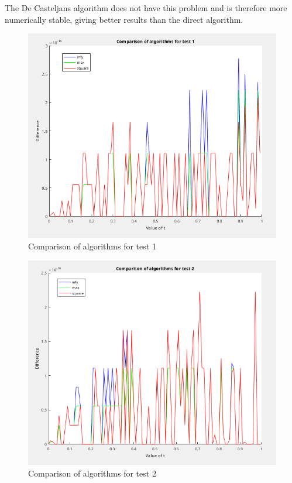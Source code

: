 \documentclass[]{article}
\begin{document}
The De Casteljans algorithm does not have this problem and is therefore more numerically stable, giving better results than the direct algorithm.

\begin{figure}
	\centering
	\includegraphics[width=0.8\linewidth]{figs/test01.png}
	\caption{Comparison of algorithms for test 1}
	\label{fig:01}
\end{figure}

\begin{figure}
	\centering
	\includegraphics[width=0.8\linewidth]{figs/test02.png}
	\caption{Comparison of algorithms for test 2}
	\label{fig:02}
\end{figure}
\end{document}
